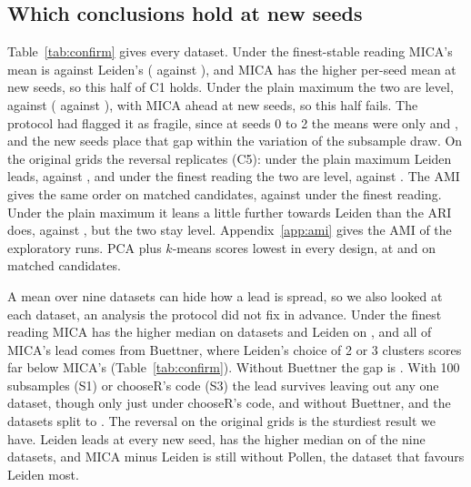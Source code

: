 \subsection{Which conclusions hold at new seeds}\label{sec:confirm}
Table~\ref{tab:confirm} gives every dataset. Under the finest-stable reading MICA's mean is
 against Leiden's  ( against ), and MICA has the higher
per-seed mean at  new seeds, so this half of C1 holds. Under the plain maximum the two are level,
 against  ( against ), with MICA ahead at 
new seeds, so this half fails. The protocol had flagged it as fragile, since at seeds 0 to 2 the means were only  and ,
and the new seeds place that gap within the variation of the subsample draw. On the original grids the
reversal replicates (C5): under the plain maximum Leiden leads,  against
, and under the finest reading the two are level,  against
. The AMI gives the same order on matched candidates,  against
 under the finest reading. Under the plain maximum it leans a little further towards
Leiden than the ARI does,  against , but the two stay level.
Appendix~\ref{app:ami} gives the AMI of the exploratory runs. PCA plus $k$-means scores lowest in every design, at
 and  on matched candidates.

A mean over nine datasets can hide how a lead is spread, so we also looked at each dataset, an analysis
the protocol did not fix in advance. Under the finest reading MICA has the higher median on
 datasets and Leiden on , and all of MICA's lead
comes from Buettner, where Leiden's choice of 2 or 3 clusters scores far below MICA's
(Table~\ref{tab:confirm}). Without Buettner the gap is . With 100 subsamples (S1) or
chooseR's code (S3) the lead survives leaving out any one dataset, though only just under chooseR's code,
 and  without Buettner, and the datasets split
 to . The reversal on the original grids is the sturdiest
result we have. Leiden leads at every new seed, has the higher median on 
of the nine datasets, and MICA minus Leiden is still  without Pollen, the dataset
that favours Leiden most.

